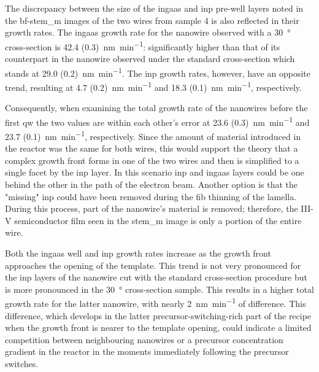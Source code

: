 The discrepancy between the size of the \acs{ingaas} and \acs{inp} pre-well layers noted in the \acs{bf}-\acs{stem_m} images of the two wires from sample 4 is also reflected in their growth rates. The \acs{ingaas} growth rate for the nanowire observed with a \qty{30}{\degree} cross-section is \qty[separate-uncertainty=true]{42.4 (0.3)}{\nano\metre\per\minute}: significantly higher than that of its counterpart in the nanowire observed under the standard cross-section which stands at \qty[separate-uncertainty=true]{29.0 (0.2)}{\nano\metre\per\minute}. The \acs{inp} growth rates, however, have an opposite trend, resulting at \qty[separate-uncertainty=true]{4.7 (0.2)}{\nano\metre\per\minute} and \qty[separate-uncertainty=true]{18.3 (0.1)}{\nano\metre\per\minute}, respectively. 

Consequently, when examining the total growth rate of the nanowires before the first \acl{qw} the two values are within each other's error at \qty[separate-uncertainty=true]{23.6 (0.3)}{\nano\metre\per\minute} and \qty[separate-uncertainty=true]{23.7 (0.1)}{\nano\metre\per\minute}, respectively. Since the amount of material introduced in the reactor was the same for both wires, this would support the theory that a complex growth front forms in one of the two wires and then is simplified to a single  facet by the \acs{inp} layer. In this scenario \acs{inp} and \acs{ingaas} layers could be one behind the other in the path of the electron beam. Another option is that the "missing" \acs{inp} could have been removed during the \acs{fib} thinning of the lamella. During this process, part of the nanowire's material is removed; therefore, the III-V semiconductor film seen in the \acs{stem_m} image is only a portion of the entire wire.

Both the \acs{ingaas} well and \acs{inp} growth rates increase as the growth front approaches the opening of the template. This trend is not very pronounced for the \acs{inp} layers of the nanowire cut with the standard cross-section procedure but is more pronounced in the \qty{30}{\degree} cross-section sample. This results in a higher total growth rate for the latter nanowire, with nearly \qty{2}{\nano\metre\per\minute} of difference. This difference, which develops in the latter precursor-switching-rich part of the recipe when the growth front is nearer to the template opening, could indicate a limited competition between neighbouring nanowires or a precursor concentration gradient in the reactor in the moments immediately following the precursor switches.
\par

